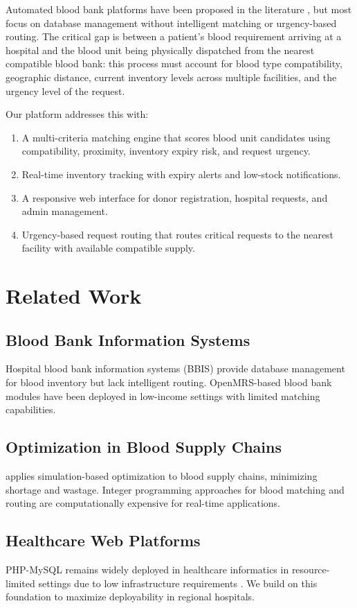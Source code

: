 \documentclass[conference]{IEEEtran}
\begin{document}
Automated blood bank platforms have been proposed in the literature \cite{nwosu2019automated}, but most focus on database management without intelligent matching or urgency-based routing. The critical gap is between a patient's blood requirement arriving at a hospital and the blood unit being physically dispatched from the nearest compatible blood bank: this process must account for blood type compatibility, geographic distance, current inventory levels across multiple facilities, and the urgency level of the request.

Our platform addresses this with:
\begin{enumerate}
\item A multi-criteria matching engine that scores blood unit candidates using compatibility, proximity, inventory expiry risk, and request urgency.
\item Real-time inventory tracking with expiry alerts and low-stock notifications.
\item A responsive web interface for donor registration, hospital requests, and admin management.
\item Urgency-based request routing that routes critical requests to the nearest facility with available compatible supply.
\end{enumerate}

\section{Related Work}

\subsection{Blood Bank Information Systems}
Hospital blood bank information systems (BBIS) \cite{dean2005blood} provide database management for blood inventory but lack intelligent routing. OpenMRS-based blood bank modules have been deployed in low-income settings with limited matching capabilities.

\subsection{Optimization in Blood Supply Chains}
\cite{osorio2015simulation} applies simulation-based optimization to blood supply chains, minimizing shortage and wastage. Integer programming approaches for blood matching and routing are computationally expensive for real-time applications.

\subsection{Healthcare Web Platforms}
PHP-MySQL remains widely deployed in healthcare informatics in resource-limited settings due to low infrastructure requirements \cite{raza2013electronic}. We build on this foundation to maximize deployability in regional hospitals.
\end{document}
